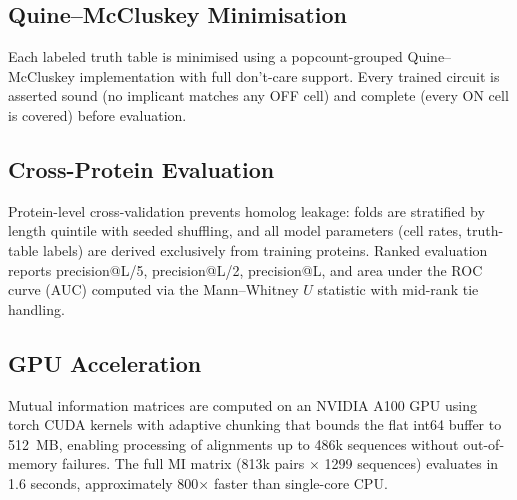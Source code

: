 \subsection{Quine--McCluskey Minimisation}
Each labeled truth table is minimised using a popcount-grouped
Quine--McCluskey implementation with full don't-care support.  Every trained
circuit is asserted sound (no implicant matches any OFF cell) and complete
(every ON cell is covered) before evaluation.

\subsection{Cross-Protein Evaluation}
Protein-level cross-validation prevents homolog leakage: folds are stratified
by length quintile with seeded shuffling, and all model parameters (cell rates,
truth-table labels) are derived exclusively from training proteins.  Ranked
evaluation reports precision@L/5, precision@L/2, precision@L, and area under
the ROC curve (AUC) computed via the Mann--Whitney $U$ statistic with mid-rank
tie handling.

\subsection{GPU Acceleration}
Mutual information matrices are computed on an NVIDIA A100 GPU using torch
CUDA kernels with adaptive chunking that bounds the flat int64 buffer to
512~MB, enabling processing of alignments up to 486k sequences without out-of-memory
failures.  The full MI matrix (813k pairs $\times$ 1299 sequences) evaluates
in 1.6 seconds, approximately 800$\times$ faster than single-core CPU.

